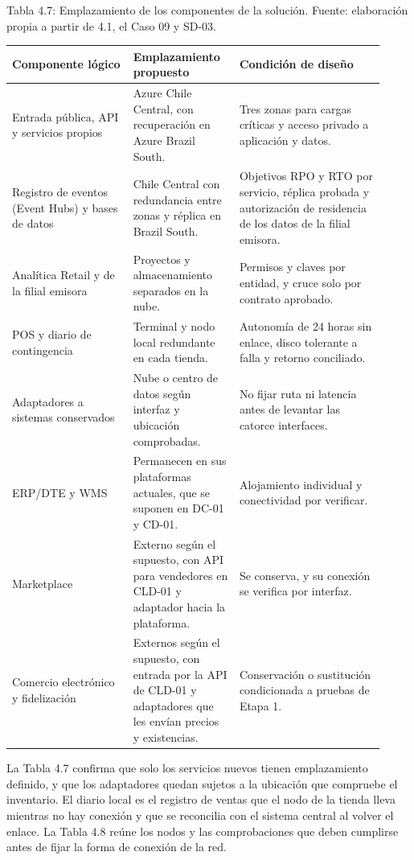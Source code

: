\documentclass[11pt]{article}
\begin{document}
Tabla 4.7: Emplazamiento de los componentes de la solución. Fuente: elaboración propia a partir de 4.1, el Caso 09 y SD-03.\par\nopagebreak
\begin{longtable}{@{}p{0.30\linewidth}p{0.26\linewidth}p{0.36\linewidth}@{}}
\toprule Componente lógico & Emplazamiento propuesto & Condición de diseño \\
\midrule\endhead\bottomrule\endlastfoot
Entrada pública, API y servicios propios & Azure Chile Central, con recuperación en Azure Brazil South. & Tres zonas para cargas críticas y acceso privado a aplicación y datos. \\
Registro de eventos (Event Hubs) y bases de datos & Chile Central con redundancia entre zonas y réplica en Brazil South. & Objetivos RPO y RTO por servicio, réplica probada y autorización de residencia de los datos de la filial emisora. \\
Analítica Retail y de la filial emisora & Proyectos y almacenamiento separados en la nube. & Permisos y claves por entidad, y cruce solo por contrato aprobado. \\
POS y diario de contingencia & Terminal y nodo local redundante en cada tienda. & Autonomía de 24 horas sin enlace, disco tolerante a falla y retorno conciliado. \\
Adaptadores a sistemas conservados & Nube o centro de datos según interfaz y ubicación comprobadas. & No fijar ruta ni latencia antes de levantar las catorce interfaces. \\
ERP/DTE y WMS & Permanecen en sus plataformas actuales, que se suponen en DC-01 y CD-01. & Alojamiento individual y conectividad por verificar. \\
Marketplace & Externo según el supuesto, con API para vendedores en CLD-01 y adaptador hacia la plataforma. & Se conserva, y su conexión se verifica por interfaz. \\
Comercio electrónico y fidelización & Externos según el supuesto, con entrada por la API de CLD-01 y adaptadores que les envían precios y existencias. & Conservación o sustitución condicionada a pruebas de Etapa 1. \\
\end{longtable}

La Tabla 4.7 confirma que solo los servicios nuevos tienen emplazamiento definido, y que los adaptadores quedan sujetos a la ubicación que compruebe el inventario. El diario local es el registro de ventas que el nodo de la tienda lleva mientras no hay conexión y que se reconcilia con el sistema central al volver el enlace. La Tabla 4.8 reúne los nodos y las comprobaciones que deben cumplirse antes de fijar la forma de conexión de la red.
\end{document}
